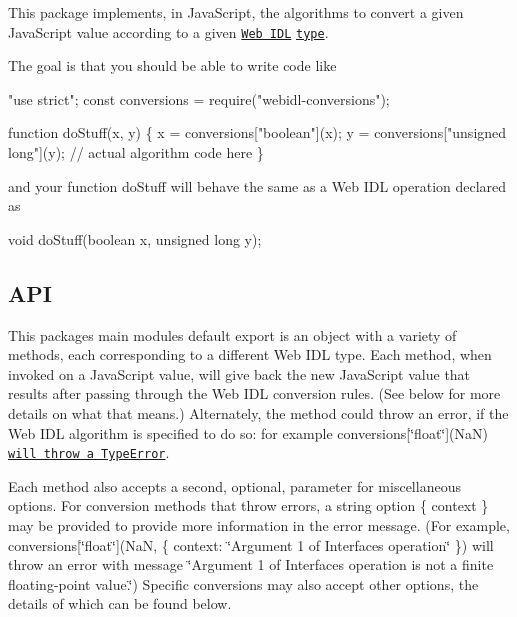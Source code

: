 This package implements, in Java\+Script, the algorithms to convert a given Java\+Script value according to a given \href{http://heycam.github.io/webidl/}{\tt Web I\+DL} \href{http://heycam.github.io/webidl/#idl-types}{\tt type}.

The goal is that you should be able to write code like


\begin{DoxyCode}
"use strict";
const conversions = require("webidl-conversions");

function doStuff(x, y) \{
    x = conversions["boolean"](x);
    y = conversions["unsigned long"](y);
    // actual algorithm code here
\}
\end{DoxyCode}


and your function {\ttfamily do\+Stuff} will behave the same as a Web I\+DL operation declared as


\begin{DoxyCode}
void doStuff(boolean x, unsigned long y);
\end{DoxyCode}


\subsection*{A\+PI}

This package\textquotesingle{}s main module\textquotesingle{}s default export is an object with a variety of methods, each corresponding to a different Web I\+DL type. Each method, when invoked on a Java\+Script value, will give back the new Java\+Script value that results after passing through the Web I\+DL conversion rules. (See below for more details on what that means.) Alternately, the method could throw an error, if the Web I\+DL algorithm is specified to do so\+: for example {\ttfamily conversions\mbox{[}\char`\"{}float\char`\"{}\mbox{]}(NaN)} \href{http://heycam.github.io/webidl/#es-float}{\tt will throw a {\ttfamily Type\+Error}}.

Each method also accepts a second, optional, parameter for miscellaneous options. For conversion methods that throw errors, a string option {\ttfamily \{ context \}} may be provided to provide more information in the error message. (For example, {\ttfamily conversions\mbox{[}\char`\"{}float\char`\"{}\mbox{]}(NaN, \{ context\+: \char`\"{}\+Argument 1 of Interface\textquotesingle{}s operation\char`\"{} \})} will throw an error with message {\ttfamily \char`\"{}\+Argument 1 of Interface\textquotesingle{}s operation is not a finite floating-\/point value.\char`\"{}}) Specific conversions may also accept other options, the details of which can be found below.

